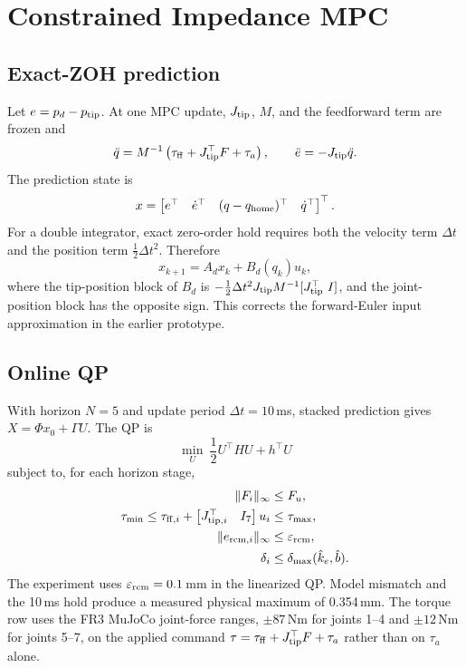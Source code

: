 \section{Constrained Impedance MPC}

\subsection{Exact-ZOH prediction}

Let $e=p_d-p_{\rm tip}$. At one MPC update, $J_{\rm tip}$, $M$, and the feedforward term are frozen and
\begin{equation}
\ddot q=M^{-1}\left(\tau_{\rm ff}+J_{\rm tip}^\top F+\tau_a\right),\qquad
\ddot e=-J_{\rm tip}\ddot q.
\end{equation}
The prediction state is
\begin{equation}
x=\begin{bmatrix}e^\top&\dot e^\top&(q-q_{\rm home})^\top&\dot q^\top\end{bmatrix}^\top.
\end{equation}
For a double integrator, exact zero-order hold requires both the velocity term $\Delta t$ and the position term $\frac12\Delta t^2$. Therefore
\begin{equation}
x_{k+1}=A_dx_k+B_d(q_k)u_k,
\label{eq:prediction}
\end{equation}
where the tip-position block of $B_d$ is $-\frac12\Delta t^2J_{\rm tip}M^{-1}[J_{\rm tip}^\top\ I]$, and the joint-position block has the opposite sign. This corrects the forward-Euler input approximation in the earlier prototype.

\subsection{Online QP}

With horizon $N=5$ and update period $\Delta t=10$\,ms, stacked prediction gives $X=\Phi x_0+\Gamma U$. The QP is
\begin{equation}
\min_U\ \frac12U^\top HU+h^\top U
\label{eq:qp}
\end{equation}
subject to, for each horizon stage,
\begin{subequations}
\begin{align}
\|F_i\|_\infty&\le F_u,\\
\tau_{\min}\le \tau_{{\rm ff},i}+
\begin{bmatrix}J_{{\rm tip},i}^\top&I_7\end{bmatrix}u_i
&\le\tau_{\max},\\
\|e_{{\rm rcm},i}\|_\infty&\le\varepsilon_{\rm rcm},\label{eq:hardrcm}\\
\delta_i&\le\delta_{\max}(\hat k_e,\hat b).\label{eq:force}
\end{align}
\end{subequations}
The experiment uses $\varepsilon_{\rm rcm}=0.1$\,mm in the linearized QP. Model mismatch and the 10\,ms hold produce a measured physical maximum of 0.354\,mm. The torque row uses the FR3 MuJoCo joint-force ranges, $\pm87$\,Nm for joints 1--4 and $\pm12$\,Nm for joints 5--7, on the applied command $\tau=\tau_{\rm ff}+J_{\rm tip}^\top F+\tau_a$ rather than on $\tau_a$ alone.

